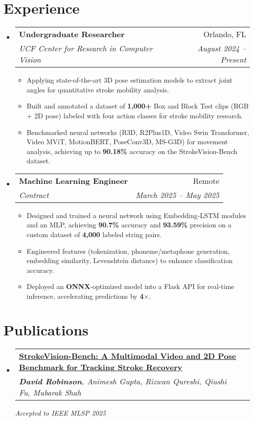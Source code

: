 \documentclass[letterpaper,11pt]{article}
\makeatletter
\newcommand{\resumeItem}[1]{
  \item\small{
    {#1 \vspace{-2pt}}
  }
}
\newcommand{\resumeSubheading}[4]{
  \vspace{-2pt}\item
    \begin{tabular*}{0.97\textwidth}[t]{l@{\extracolsep{\fill}}r}
      \textbf{#1} & #2 \\
      \textit{\small#3} & \textit{\small #4} \\
    \end{tabular*}\vspace{-7pt}
}
\newcommand{\resumeSubHeadingListStart}{\begin{itemize}[leftmargin=0.15in, label={}]}
\newcommand{\resumeSubHeadingListEnd}{\end{itemize}}
\newcommand{\resumeItemListStart}{\begin{itemize}}
\newcommand{\resumeItemListEnd}{\end{itemize}\vspace{-5pt}}
\makeatother
\begin{document}
\section{Experience}
  \resumeSubHeadingListStart
  \resumeSubheading
    {Undergraduate Researcher}{Orlando, FL}
    {UCF Center for Research in Computer Vision}{August 2024 -- Present}
    \resumeItemListStart
      \resumeItem{Applying state-of-the-art 3D pose estimation models to extract joint angles for quantitative stroke mobility analysis.}
      \resumeItem{Built and annotated a dataset of \textbf{1,000+} Box and Block Test clips (RGB + 2D pose) labeled with four action classes for stroke mobility research.}
      \resumeItem{Benchmarked neural networks (R3D, R2Plus1D, Video Swin Transformer, Video MViT, MotionBERT, PoseConv3D, MS-G3D) for movement analysis, achieving up to \textbf{90.18\%} accuracy on the StrokeVision-Bench dataset.}
    \resumeItemListEnd
    \resumeSubheading
      {Machine Learning Engineer}{Remote}
      {Contract}{March 2025 -- May 2025}
      \resumeItemListStart
        \resumeItem{Designed and trained a neural network using Embedding-LSTM modules and an MLP, achieving \textbf{90.7\%} accuracy and \textbf{93.59\%} precision on a custom dataset of \textbf{4,000} labeled string pairs.}
        \resumeItem{Engineered features (tokenization, phoneme/metaphone generation, embedding similarity, Levenshtein distance) to enhance classification accuracy.}
        \resumeItem{Deployed an \textbf{ONNX}-optimized model into a Flask API for real-time inference, accelerating predictions by \textbf{4$\times$}.}
      \resumeItemListEnd
  \resumeSubHeadingListEnd
  
  \section{Publications}
  \resumeSubHeadingListStart
    \resumeSubheading
      {\href{https://arxiv.org/abs/2509.07994}{\textbf{\uline{StrokeVision-Bench: A Multimodal Video and 2D Pose Benchmark for Tracking Stroke Recovery}}}}{} 
      {\textbf{David Robinson}, Animesh Gupta, Rizwan Qureshi, Qiushi Fu, Mubarak Shah}{}
      \vspace{0em}

      \textit{Accepted to IEEE MLSP 2025}
  \resumeSubHeadingListEnd
\end{document}

